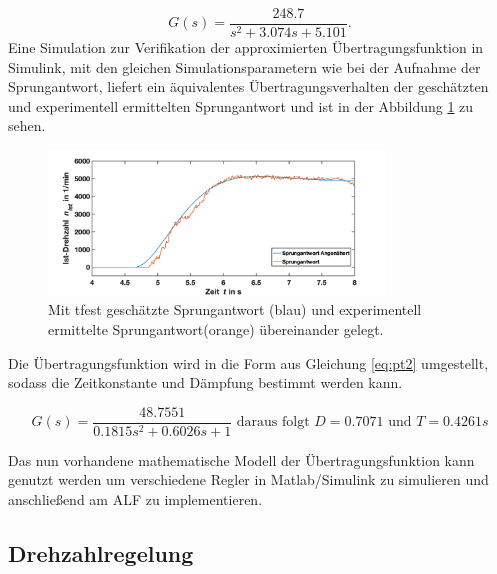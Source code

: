 			\begin{equation}
			G(s)=\frac{248.7}{s^2+3.074s+5.101}\text{.}
			\label{eq:tfestpt2}
			\end{equation}\newline
			Eine Simulation zur Verifikation der approximierten Übertragungsfunktion in Simulink, mit den gleichen Simulationsparametern wie bei der Aufnahme der Sprungantwort, liefert ein äquivalentes Übertragungsverhalten der geschätzten und experimentell ermittelten Sprungantwort und ist in der Abbildung \ref{fig: transfer estimate} zu sehen.
			 
			 \begin{figure}[H]
			 	\centering
			 	\includegraphics[width=0.8\textwidth]{Bilder/sprungantwort_estimate.png}
			 	\caption{Mit tfest geschätzte Sprungantwort (blau) und experimentell ermittelte Sprungantwort(orange) übereinander gelegt.}
			 	\label{fig: transfer estimate}
			 \end{figure}
		 
			Die Übertragungsfunktion wird in die Form aus Gleichung \ref{eq:pt2} umgestellt, sodass die Zeitkonstante und Dämpfung bestimmt werden kann. 
			 
			 \begin{equation}
			 G(s)=\frac{48.7551}{0.1815s^2+0.6026s+1} \text{ daraus folgt } D=0.7071 \text{ und } T=0.4261s
			 \label{eq:tfestpt2}
			 \end{equation}\newline			
			 
			Das nun vorhandene mathematische Modell der Übertragungsfunktion kann genutzt werden um verschiedene Regler in Matlab/Simulink zu simulieren und anschließend am ALF zu implementieren.
			
			
		\subsection{Drehzahlregelung}
		\label{sec: Drehzahlregelung}
		
